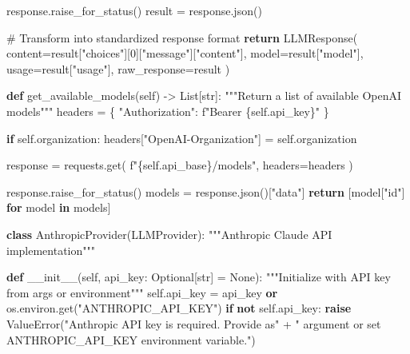 \documentclass[
  11pt,
  letterpaper,
]{book}
\newenvironment{Shaded}{\begin{snugshade}}{\end{snugshade}}
\newcommand{\BuiltInTok}[1]{\textcolor[rgb]{0.00,0.23,0.31}{#1}}
\newcommand{\CommentTok}[1]{\textcolor[rgb]{0.37,0.37,0.37}{#1}}
\newcommand{\ControlFlowTok}[1]{\textcolor[rgb]{0.00,0.23,0.31}{\textbf{#1}}}
\newcommand{\DecValTok}[1]{\textcolor[rgb]{0.68,0.00,0.00}{#1}}
\newcommand{\FunctionTok}[1]{\textcolor[rgb]{0.28,0.35,0.67}{#1}}
\newcommand{\KeywordTok}[1]{\textcolor[rgb]{0.00,0.23,0.31}{\textbf{#1}}}
\newcommand{\NormalTok}[1]{\textcolor[rgb]{0.00,0.23,0.31}{#1}}
\newcommand{\OperatorTok}[1]{\textcolor[rgb]{0.37,0.37,0.37}{#1}}
\newcommand{\PreprocessorTok}[1]{\textcolor[rgb]{0.68,0.00,0.00}{#1}}
\newcommand{\SpecialCharTok}[1]{\textcolor[rgb]{0.37,0.37,0.37}{#1}}
\newcommand{\SpecialStringTok}[1]{\textcolor[rgb]{0.13,0.47,0.30}{#1}}
\newcommand{\StringTok}[1]{\textcolor[rgb]{0.13,0.47,0.30}{#1}}
\newcommand{\VariableTok}[1]{\textcolor[rgb]{0.07,0.07,0.07}{#1}}
\begin{document}
\begin{Shaded}
\begin{Highlighting}[]
\NormalTok{        response.raise\_for\_status()}
\NormalTok{        result }\OperatorTok{=}\NormalTok{ response.json()}

        \CommentTok{\# Transform into standardized response format}
        \ControlFlowTok{return}\NormalTok{ LLMResponse(}
\NormalTok{            content}\OperatorTok{=}\NormalTok{result[}\StringTok{"choices"}\NormalTok{][}\DecValTok{0}\NormalTok{][}\StringTok{"message"}\NormalTok{][}\StringTok{"content"}\NormalTok{],}
\NormalTok{            model}\OperatorTok{=}\NormalTok{result[}\StringTok{"model"}\NormalTok{],}
\NormalTok{            usage}\OperatorTok{=}\NormalTok{result[}\StringTok{"usage"}\NormalTok{],}
\NormalTok{            raw\_response}\OperatorTok{=}\NormalTok{result}
\NormalTok{        )}

    \KeywordTok{def}\NormalTok{ get\_available\_models(}\VariableTok{self}\NormalTok{) }\OperatorTok{{-}\textgreater{}}\NormalTok{ List[}\BuiltInTok{str}\NormalTok{]:}
        \CommentTok{"""Return a list of available OpenAI models"""}
\NormalTok{        headers }\OperatorTok{=}\NormalTok{ \{}
            \StringTok{"Authorization"}\NormalTok{: }\SpecialStringTok{f"Bearer }\SpecialCharTok{\{}\VariableTok{self}\SpecialCharTok{.}\NormalTok{api\_key}\SpecialCharTok{\}}\SpecialStringTok{"}
\NormalTok{        \}}

        \ControlFlowTok{if} \VariableTok{self}\NormalTok{.organization:}
\NormalTok{            headers[}\StringTok{"OpenAI{-}Organization"}\NormalTok{] }\OperatorTok{=} \VariableTok{self}\NormalTok{.organization}

\NormalTok{        response }\OperatorTok{=}\NormalTok{ requests.get(}
            \SpecialStringTok{f"}\SpecialCharTok{\{}\VariableTok{self}\SpecialCharTok{.}\NormalTok{api\_base}\SpecialCharTok{\}}\SpecialStringTok{/models"}\NormalTok{,}
\NormalTok{            headers}\OperatorTok{=}\NormalTok{headers}
\NormalTok{        )}

\NormalTok{        response.raise\_for\_status()}
\NormalTok{        models }\OperatorTok{=}\NormalTok{ response.json()[}\StringTok{"data"}\NormalTok{]}
        \ControlFlowTok{return}\NormalTok{ [model[}\StringTok{"id"}\NormalTok{] }\ControlFlowTok{for}\NormalTok{ model }\KeywordTok{in}\NormalTok{ models]}

\KeywordTok{class}\NormalTok{ AnthropicProvider(LLMProvider):}
    \CommentTok{"""Anthropic Claude API implementation"""}

    \KeywordTok{def} \FunctionTok{\_\_init\_\_}\NormalTok{(}\VariableTok{self}\NormalTok{, api\_key: Optional[}\BuiltInTok{str}\NormalTok{] }\OperatorTok{=} \VariableTok{None}\NormalTok{):}
        \CommentTok{"""Initialize with API key from args or environment"""}
        \VariableTok{self}\NormalTok{.api\_key }\OperatorTok{=}\NormalTok{ api\_key }\KeywordTok{or}\NormalTok{ os.environ.get(}\StringTok{"ANTHROPIC\_API\_KEY"}\NormalTok{)}
        \ControlFlowTok{if} \KeywordTok{not} \VariableTok{self}\NormalTok{.api\_key:}
            \ControlFlowTok{raise} \PreprocessorTok{ValueError}\NormalTok{(}\StringTok{"Anthropic API key is required. Provide as"}
              \OperatorTok{+} \StringTok{" argument or set ANTHROPIC\_API\_KEY environment variable."}\NormalTok{)}


\end{Highlighting}
\end{Shaded}
\end{document}
